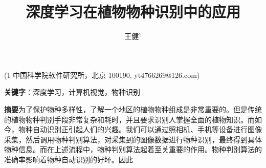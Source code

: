 \documentclass[a4paper]{ctexart} %
\title{深度学习在植物物种识别中的应用}
\author{王健$^1$}
\begin{document}
	\maketitle
	\begin{center}
		(1 中国科学院软件研究所，北京 100190, yt4766269@126.com)
	\end{center}
\begin{center}
	\textbf{关键字}：深度学习，计算机视觉，物种识别
\end{center}
\textbf{摘要}\quad 为了保护物种多样性，了解一个地区的植物物种组成是非常重要的。但是传统的植物物种判别手段非常复杂和耗时，并且要求识别人掌握全面的植物知识。而如今，物种自动识别正引起人们的兴趣。我们可以通过照相机、手机等设备进行图像采集，然后调用物种判别算法，对采集到的图像数据进行物种识别，最终得到具体物种信息。而在上述流程中，物种判别算法起着至关重要的作用。物种判别算法的准确率影响着物种自动识别的好坏。因此
\end{document}

